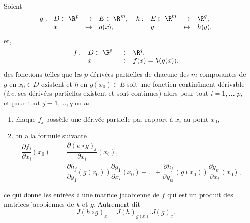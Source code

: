 \documentclass[class=report,crop=false]{standalone}
\begin{document}
 
 \begin{proposition}
\textcolor[rgb]{0.50,0.00,0.25}{
Soient 
\begin{equation*}
\begin{array}{llll}
g:& D \subset \R^p &\rightarrow & E \subset \R^m, \\
 & x & \mapsto & g(x),
\end{array}
\;
\begin{array}{llll}
h:& E  \subset \R^m &\rightarrow &  \R^q, \\
 & y & \mapsto & h(y),
\end{array}
\end{equation*}
et,
\begin{equation*}
\begin{array}{llll}
f:& D  \subset \R^p &\rightarrow &  \R^q, \\
 & x & \mapsto & f(x)=h(g(x)).
\end{array}
\end{equation*}
des fonctions telles que les $p$ dérivées partielles de chacune des $m$ composantes de $g$ en $x_0 \in D$ existent et $h$ en $g(x_0) \in E$ soit une fonction continûment
dérivable (\textit{i.e.} ses dérivées partielles existent et sont continues) alors pour tout $i=1,...,p,$
et pour tout $j=1,...,q$ on a:
\begin{enumerate}
\item chaque $f_j$ possède une dérivée partielle par rapport à $x_i$ au point $x_0$,
\item on a la formule suivante
\begin{equation*}
\begin{array}{lll}
\dfrac{\partial f_j}{ \partial x_i}(x_0) & = & \dfrac{\partial (h \circ g)_j}{ \partial x_i}(x_0),\\
 &=& \dfrac{\partial h_j}{ \partial y_1}(g(x_0))\dfrac{\partial g_1}{ \partial x_i}(x_0)+...+\dfrac{\partial h_j}{ \partial y_m}(g(x_0))\dfrac{\partial g_m}{ \partial x_i}(x_0),
\end{array}
\end{equation*}
\end{enumerate}
ce qui donne les entrées d'une matrice jacobienne de $f$ qui est un produit des matrices
jacobiennes de $h$ et $g$. Autrement dit, 
\begin{equation*}
J(h \circ g)_x=J(h)_{g(x)}.J(g)_x.
\end{equation*}
}
\end{proposition}
\end{document}
